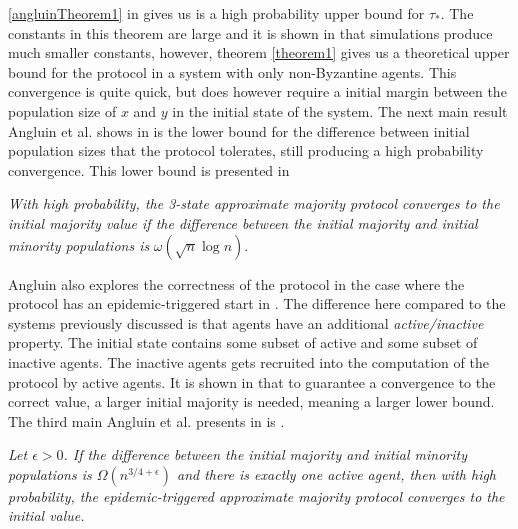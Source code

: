 \ref{angluinTheorem1} in  gives us is a high probability upper bound for $\tau_*$. The constants in this theorem are large and it is shown in \cite{angluinSimplePopulationProtocol2008} that simulations produce much smaller constants, however, theorem \ref{theorem1} gives us a theoretical upper bound for the protocol in a system with only non-Byzantine agents. This convergence is quite quick, but does however require a initial margin between the population size of $x$ and $y$ in the initial state of the system. The next main result Angluin et al. shows in \cite{angluinSimplePopulationProtocol2008} is the lower bound for the difference between initial population sizes that the protocol tolerates, still producing a high probability convergence. This lower bound is presented in 


 \begin{theorem}
    \textit{With high probability, the 3-state approximate majority protocol converges to the initial majority value if the difference between the initial majority and initial minority populations is } $\omega(\sqrt{n} \log n)$.
 \end{theorem} 

 Angluin also explores the correctness of the protocol in the case where the protocol has an epidemic-triggered start in \cite{angluinSimplePopulationProtocol2008}. The difference here compared to the systems previously discussed is that agents have an additional \emph{active/inactive} property. The initial state contains some subset of active and some subset of inactive agents. The inactive agents gets recruited into the computation of the protocol by active agents. It is shown in \cite{angluinSimplePopulationProtocol2008} that to guarantee a convergence to the correct value, a larger initial majority is needed, meaning a larger lower bound. The third main Angluin et al. presents in \cite{angluinSimplePopulationProtocol2008} is .

 \begin{theorem}
    \textit{Let $\epsilon > 0$. If the difference between the initial majority and initial minority populations is $\Omega(n^{3/4+\epsilon})$ and there is exactly one active agent, then with high probability, the epidemic-triggered approximate majority protocol converges to the initial value.}
 \end{theorem} 

